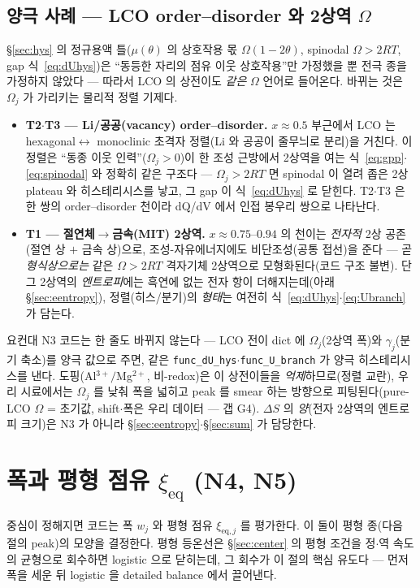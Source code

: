 \documentclass[11pt,a4paper]{article}
\newcommand{\eq}{\mathrm{eq}}
\newcommand{\code}[1]{\texttt{#1}}
\begin{document}
\subsection{양극 사례 — LCO order--disorder 와 2상역 $\Omega$}\label{sub:lcohys}
\S\ref{sec:hys} 의 정규용액 틀($\mu(\theta)$ 의 상호작용 몫 $\Omega(1-2\theta)$, spinodal $\Omega>2RT$, gap
식~\eqref{eq:dUhys})은 ``동등한 자리의 점유 이웃 상호작용''만 가정했을 뿐 전극 종을 가정하지 않았다 — 따라서 LCO 의
상전이도 \emph{같은} $\Omega$ 언어로 들어온다. 바뀌는 것은 $\Omega_j$ 가 가리키는 물리적 정렬 기제다.
\begin{itemize}[leftmargin=1.4em,itemsep=1pt,topsep=1pt]
\item \textbf{T2$\cdot$T3 — Li/공공(vacancy) order--disorder.} $x\approx0.5$ 부근에서 LCO 는 hexagonal$\leftrightarrow$
monoclinic 초격자 정렬(Li 와 공공이 줄무늬로 분리)을 거친다. 이 정렬은 ``동종 이웃 인력''($\Omega_j>0$)이 한 조성
근방에서 2상역을 여는 식~\eqref{eq:gpp}$\cdot$\eqref{eq:spinodal} 와 정확히 같은 구조다 — $\Omega_j>2RT$ 면 spinodal 이
열려 좁은 2상 plateau 와 히스테리시스를 낳고, 그 gap 이 식~\eqref{eq:dUhys} 로 닫힌다. T2$\cdot$T3 은 한 쌍의
order--disorder 천이라 dQ/dV 에서 인접 봉우리 쌍으로 나타난다.
\item \textbf{T1 — 절연체$\to$금속(MIT) 2상역.} $x\approx0.75$--$0.94$ 의 천이는 \emph{전자적} 2상 공존(절연 상 $+$
금속 상)으로, 조성-자유에너지에도 비단조성(공통 접선)을 준다 — 곧 \emph{형식상으로는} 같은 $\Omega>2RT$ 격자기체
2상역으로 모형화된다(코드 구조 불변). 단 그 2상역의 \emph{엔트로피}에는 흑연에 없는 전자 항이 더해지는데(아래
\S\ref{sec:eentropy}), 정렬(히스/분기)의 \emph{형태}는 여전히 식~\eqref{eq:dUhys}$\cdot$\eqref{eq:Ubranch} 가 담는다.
\end{itemize}
요컨대 N3 코드는 한 줄도 바뀌지 않는다 — LCO 전이 dict 에 $\Omega_j$(2상역 폭)와 $\gamma_j$(분기 축소)를 양극 값으로
주면, 같은 \code{func\_dU\_hys}$\cdot$\code{func\_U\_branch} 가 양극 히스테리시스를 낸다. 도핑(Al$^{3+}/$Mg$^{2+}$,
비-redox)은 이 상전이들을 \emph{억제}하므로(정렬 교란), 우리 시료에서는 $\Omega_j$ 를 낮춰 폭을 넓히고 peak 를 smear 하는
방향으로 피팅된다(pure-LCO $\Omega$ = 초기값, shift$\cdot$폭은 우리 데이터 — 갭 G4). $\Delta S$ 의 \emph{양}(전자
2상역의 엔트로피 크기)은 N3 가 아니라 \S\ref{sec:eentropy}$\cdot$\S\ref{sec:sum} 가 담당한다.

\section{폭과 평형 점유 $\xi_\eq$ (N4, N5)}\label{sec:width}
중심이 정해지면 코드는 폭 $w_j$ 와 평형 점유 $\xi_{\eq,j}$ 를 평가한다. 이 둘이 평형 종(다음 절의 peak)의 모양을
결정한다. 평형 등온선은 \S\ref{sec:center} 의 평형 조건을 정$\cdot$역 속도의 균형으로 회수하면 logistic 으로 닫히는데,
그 회수가 이 절의 핵심 유도다 — 먼저 폭을 세운 뒤 logistic 을 detailed balance 에서 끌어낸다.
\end{document}

